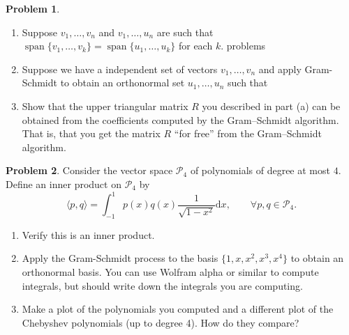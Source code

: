\documentclass[12pt]{article}
\theoremstyle{definition}
\newtheorem{problem}{Problem}
\renewcommand{\d}{\mathrm{d}}
\begin{document}
\clearpage
\begin{problem}~

    \begin{enumerate}
        \item  Suppose $v_1, \ldots, v_n$ and $v_1, \ldots, u_n$ are such that $\operatorname{span}\{v_1, \ldots, v_k\} = \operatorname{span}\{u_1, \ldots, u_k\}$ for each $k$.
        problems
        \item 
    Suppose we have a independent set of vectors $v_1, \ldots, v_n$ and apply Gram-Schmidt to obtain an orthonormal set $u_1, \ldots, u_n$ such that 

        \begin{center}
        \end{center}

        \item Show that the upper triangular matrix $R$ you described in part (a) can be obtained from the coefficients computed by the Gram--Schmidt algorithm. 
        That is, that you get the matrix $R$ ``for free'' from the Gram--Schmidt algorithm.

    \end{enumerate}
\end{problem}

\begin{problem}
    Consider the vector space $\mathcal{P}_4$ of polynomials of degree at most $4$. 
    Define an inner product on $\mathcal{P}_4$ by
    $$ 
    \langle p,q\rangle = \int_{-1}^{1} p(x) q(x) \frac{1}{\sqrt{1-x^2}}\d{x},
    \qquad \forall p,q\in\mathcal{P}_4.
    $$

    \begin{enumerate}
        \item Verify this is an inner product.
        \item Apply the Gram-Schmidt process to the basis $\{1,x,x^2,x^3,x^4\}$ to obtain an orthonormal basis.
        You can use Wolfram alpha or similar to compute integrals, but should write down the integrals you are computing.
        \item Make a plot of the polynomials you computed and a different plot of the Chebyshev polynomials (up to degree 4). How do they compare?
    \end{enumerate}
\end{problem}
\end{document}
